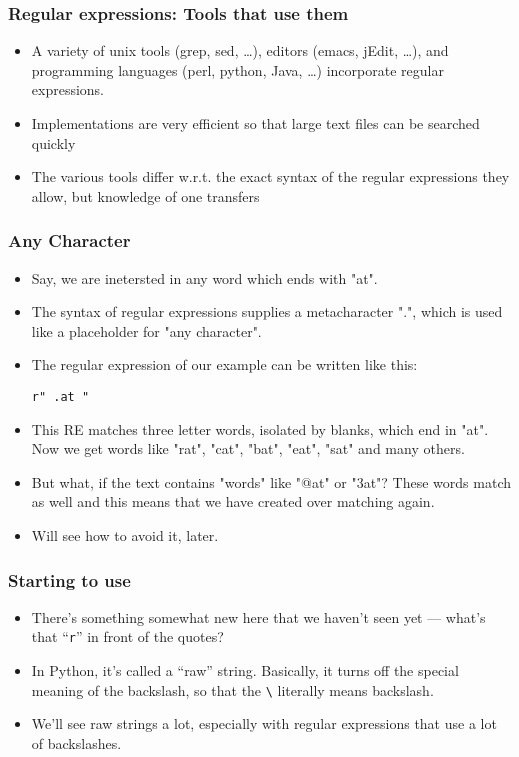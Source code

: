  \begin{frame}[fragile]
  \frametitle{Regular expressions: Tools that use them}

  \begin{itemize}
  \item A variety of unix tools (grep, sed, \ldots), editors (emacs,
    jEdit, \ldots), and programming languages (perl, python, Java, \ldots)
    incorporate regular expressions.

  \item Implementations are very efficient so that large text files
    can be searched quickly
\item The various tools differ w.r.t. the exact syntax of the regular
expressions they allow, but knowledge of one transfers
  \end{itemize}
\end{frame}


 \begin{frame}[fragile]
\frametitle{Any Character}

\begin{itemize}
\item Say, we are inetersted in any word which ends with "at".
\item The syntax of regular expressions supplies a metacharacter ".", which is used like a placeholder for "any character". 
\item The regular expression of our example can be written like this: 

\begin{lstlisting}
r" .at " 
\end{lstlisting}
\item This RE matches three letter words, isolated by blanks, which end in "at". Now we get words like "rat", "cat", "bat", "eat", "sat" and many others. 
\item But what, if the text contains "words" like "@at" or "3at"? These words match as well and this means that we have created over matching again. 
\item Will see how to avoid it, later.
\end{itemize}
\end{frame}

 \begin{frame}[fragile]
\frametitle{Starting to use}
\begin{itemize}
\item There's something somewhat new here that we haven't seen yet ---
what's that ``\texttt{r}'' in front of the quotes?  
\item  In Python, it's
called a ``raw'' string.  Basically, it turns off the special meaning
of the backslash, so that the \lstinline+\+ literally means backslash.
\item We'll see raw strings a lot, especially with regular expressions that
use a lot of backslashes.
\end{itemize}
\end{frame}

